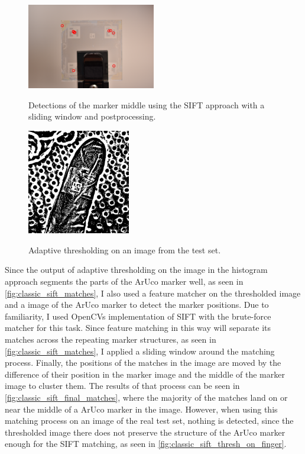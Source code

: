 \documentclass[10pt]{book}
\newcommand{\figureref}[1]{\autoref{#1}}
\begin{document}
\begin{figure}
  \caption{Detections of the marker middle using the \ac{SIFT} approach with a sliding window and postprocessing.}
  \includegraphics[width=0.5\textwidth]{image/classic_sift_final_matches}
  \label{fig:classic_sift_final_matches}
\end{figure}

\begin{figure}
  \caption{Adaptive thresholding on an image from the test set.}
  \includegraphics[width=0.4\textwidth]{image/classic_sift_thresh_on_finger}
  \label{fig:classic_sift_thresh_on_finger}
\end{figure}

Since the output of adaptive thresholding on the image in the histogram approach segments the parts of the \ac{ArUco} marker well, as seen in \figureref{fig:classic_sift_matches}, I also used a feature matcher on the thresholded image and a image of the \ac{ArUco} marker to detect the marker positions. Due to familiarity, I used \acp{OpenCV} implementation of \ac{SIFT} with the brute-force matcher for this task. Since feature matching in this way will separate its matches across the repeating marker structures, as seen in \figureref{fig:classic_sift_matches}, I applied a sliding window around the matching process. Finally, the positions of the matches in the image are moved by the difference of their position in the marker image and the middle of the marker image to cluster them. The results of that process can be seen in \figureref{fig:classic_sift_final_matches}, where the majority of the matches land on or near the middle of a \ac{ArUco} marker in the image. However, when using this matching process on an image of the real test set, nothing is detected, since the thresholded image there does not preserve the structure of the \ac{ArUco} marker enough for the \ac{SIFT} matching, as seen in \figureref{fig:classic_sift_thresh_on_finger}.
\end{document}
